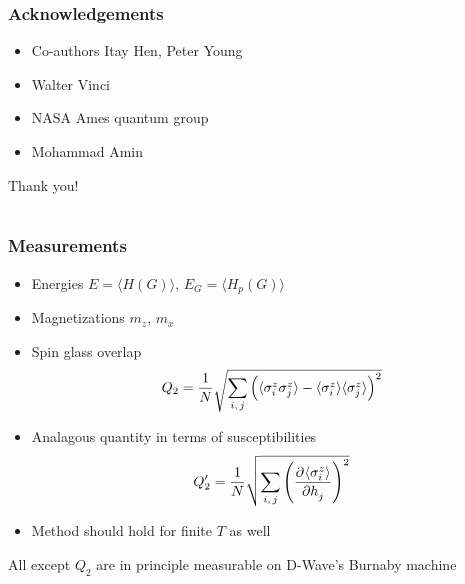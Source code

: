 \documentclass{beamer}
\newcommand{\ev}[1]{\langle #1 \rangle} %
\begin{document}
\begin{frame}
  \frametitle{Acknowledgements}
  \begin{itemize}
    \item Co-authors Itay Hen, Peter Young
    \item Walter Vinci
    \item NASA Ames quantum group
    \item Mohammad Amin
  \end{itemize}
  \vfill
  \begin{center}
    \huge Thank you!
  \end{center}
\end{frame}

\appendix
\section{\appendixname}

\begin{frame}
  \frametitle{Measurements}
  \begin{itemize}
    \item Energies $E=\ev{H(G)}$, $E_G=\ev{H_p(G)}$
    \item Magnetizations $m_z$, $m_x$
    \item Spin glass overlap
    \begin{equation*}
      Q_2 = \frac{1}{N} \sqrt{
        \sum_{i,\,j} \del{
          \ev{\sigma^z_i \sigma^z_j} -
          \ev{\sigma^z_i} \ev{\sigma^z_j}
        }^2
      }
    \end{equation*}
    \item Analagous quantity in terms of susceptibilities
    \begin{equation*}
      Q_2' = \frac{1}{N} \sqrt{\sum_{i,\,j} \del{\dpd{\ev{\sigma^z_i}}{h_j}}^2}
    \end{equation*}

    \item Method should hold for finite $T$ as well
  \end{itemize}
  \alert{All except $Q_2$ are in principle measurable on D-Wave's Burnaby machine}
\end{frame}
\end{document}
